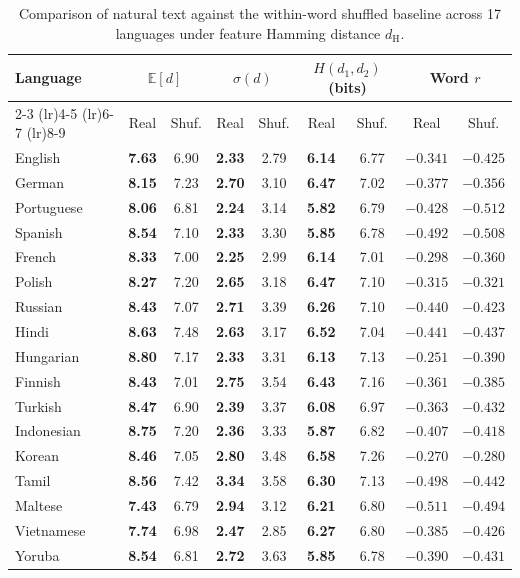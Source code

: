 \documentclass[11pt,a4paper,leqno]{article}
\begin{document}
\begin{table}[htbp]
\caption{Comparison of natural text against the within-word shuffled baseline across 17 languages under feature Hamming distance $d_{\text{H}}$.}
\centering\footnotesize
\begin{tabular}{lcccccccc}
\toprule
Language & \multicolumn{2}{c}{$\mathbb{E}[d]$} & \multicolumn{2}{c}{$\sigma(d)$} & \multicolumn{2}{c}{$H(d_1, d_2)$ (bits)} & \multicolumn{2}{c}{Word $r$} \\
\cmidrule(lr){2-3} \cmidrule(lr){4-5} \cmidrule(lr){6-7} \cmidrule(lr){8-9}
 & Real & Shuf. & Real & Shuf. & Real & Shuf. & Real & Shuf. \\
\midrule
English    & \textbf{7.63} & 6.90 & \textbf{2.33} & 2.79 & \textbf{6.14} & 6.77 & $-0.341$ & $-0.425$ \\
German     & \textbf{8.15} & 7.23 & \textbf{2.70} & 3.10 & \textbf{6.47} & 7.02 & $-0.377$ & $-0.356$ \\
Portuguese & \textbf{8.06} & 6.81 & \textbf{2.24} & 3.14 & \textbf{5.82} & 6.79 & $-0.428$ & $-0.512$ \\
Spanish    & \textbf{8.54} & 7.10 & \textbf{2.33} & 3.30 & \textbf{5.85} & 6.78 & $-0.492$ & $-0.508$ \\
French     & \textbf{8.33} & 7.00 & \textbf{2.25} & 2.99 & \textbf{6.14} & 7.01 & $-0.298$ & $-0.360$ \\
Polish     & \textbf{8.27} & 7.20 & \textbf{2.65} & 3.18 & \textbf{6.47} & 7.10 & $-0.315$ & $-0.321$ \\
Russian    & \textbf{8.43} & 7.07 & \textbf{2.71} & 3.39 & \textbf{6.26} & 7.10 & $-0.440$ & $-0.423$ \\
Hindi      & \textbf{8.63} & 7.48 & \textbf{2.63} & 3.17 & \textbf{6.52} & 7.04 & $-0.441$ & $-0.437$ \\
Hungarian  & \textbf{8.80} & 7.17 & \textbf{2.33} & 3.31 & \textbf{6.13} & 7.13 & $-0.251$ & $-0.390$ \\
Finnish    & \textbf{8.43} & 7.01 & \textbf{2.75} & 3.54 & \textbf{6.43} & 7.16 & $-0.361$ & $-0.385$ \\
Turkish    & \textbf{8.47} & 6.90 & \textbf{2.39} & 3.37 & \textbf{6.08} & 6.97 & $-0.363$ & $-0.432$ \\
Indonesian & \textbf{8.75} & 7.20 & \textbf{2.36} & 3.33 & \textbf{5.87} & 6.82 & $-0.407$ & $-0.418$ \\
Korean     & \textbf{8.46} & 7.05 & \textbf{2.80} & 3.48 & \textbf{6.58} & 7.26 & $-0.270$ & $-0.280$ \\
Tamil      & \textbf{8.56} & 7.42 & \textbf{3.34} & 3.58 & \textbf{6.30} & 7.13 & $-0.498$ & $-0.442$ \\
Maltese    & \textbf{7.43} & 6.79 & \textbf{2.94} & 3.12 & \textbf{6.21} & 6.80 & $-0.511$ & $-0.494$ \\
Vietnamese & \textbf{7.74} & 6.98 & \textbf{2.47} & 2.85 & \textbf{6.27} & 6.80 & $-0.385$ & $-0.426$ \\
Yoruba     & \textbf{8.54} & 6.81 & \textbf{2.72} & 3.63 & \textbf{5.85} & 6.78 & $-0.390$ & $-0.431$ \\
\bottomrule
\end{tabular}
\label{tab:comparison}
\end{table}
\end{document}
